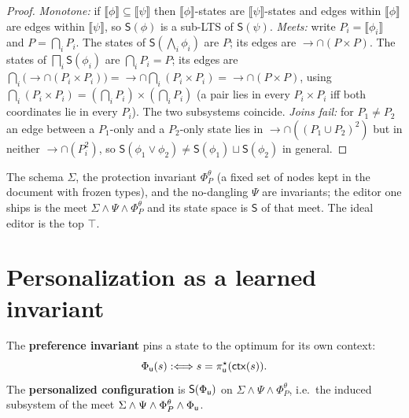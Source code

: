 \documentclass[../uxoxo-main]{subfiles}
\begin{document}
\begin{proof}
\emph{Monotone:} if $\llbracket\phi\rrbracket\subseteq\llbracket\psi\rrbracket$
then $\llbracket\phi\rrbracket$-states are $\llbracket\psi\rrbracket$-states and
edges within $\llbracket\phi\rrbracket$ are edges within
$\llbracket\psi\rrbracket$, so $\mathsf S(\phi)$ is a sub-LTS of $\mathsf
S(\psi)$. \emph{Meets:} write $P_i=\llbracket\phi_i\rrbracket$ and $P=\bigcap_i
P_i$. The states of $\mathsf S(\bigwedge_i\phi_i)$ are $P$; its edges are
$\to\cap(P\times P)$. The states of $\bigsqcap_i\mathsf S(\phi_i)$ are
$\bigcap_iP_i=P$; its edges are $\bigcap_i\bigl(\to\cap(P_i\times P_i)\bigr)=
\to\cap\bigcap_i(P_i\times P_i)=\to\cap(P\times P)$, using
$\bigcap_i(P_i\times P_i)=(\bigcap_iP_i)\times(\bigcap_iP_i)$ (a pair lies in
every $P_i\times P_i$ iff both coordinates lie in every $P_i$). The two
subsystems coincide. \emph{Joins fail:} for $P_1\ne P_2$ an edge between a
$P_1$-only and a $P_2$-only state lies in $\to\cap((P_1\cup P_2)^{2})$ but in
neither $\to\cap(P_i^{2})$, so
$\mathsf S(\phi_1\vee\phi_2)\ne\mathsf S(\phi_1)\sqcup\mathsf S(\phi_2)$ in
general.
\end{proof}

\begin{example}\label{ex:invariants}
The schema $\Sigma$, the protection invariant $\Phi^{\theta}_{P}$ (a fixed set of
nodes kept in the document with frozen types), and the no-dangling $\Psi$ are
invariants; the editor one ships is the meet $\Sigma\wedge\Psi\wedge\Phi^\theta_P$
and its state space is $\mathsf S$ of that meet. The ideal editor is the top
$\top$.
\end{example}

\section{Personalization as a learned invariant}\label{sec:phiu}
\begin{definition}\label{def:phiu}
The \textbf{preference invariant} pins a state to the optimum for its own
context:
\[
  \Phi_{\mathsf{u}}(s)\mathrel{:\Longleftrightarrow} s=\pi^\star_{\mathsf{u}}(\mathsf{ctx}(s)).
\]
The \textbf{personalized configuration} is $\mathsf S(\Phi_{\mathsf{u}})$ on
$\Sigma\wedge\Psi\wedge\Phi^\theta_P$, i.e.\ the induced subsystem of the meet
$\Sigma\wedge\Psi\wedge\Phi^\theta_P\wedge\Phi_{\mathsf{u}}$.
\end{definition}
\end{document}
